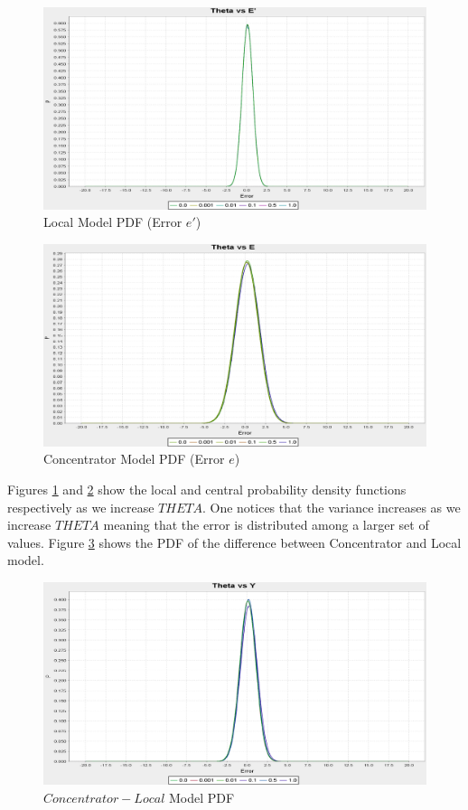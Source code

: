 \documentclass{mproj}
\begin{document}
\begin{figure}[H]
  \caption{Local Model PDF (Error $e'$)}
  \label{fig:thetaedash}
\centerline{\includegraphics[scale=0.3]{ThetaEDASH}}
\end{figure}

\begin{figure}[H]
\caption{Concentrator Model PDF (Error $e$)}
\label{fig:thetae}
\centerline{\includegraphics[scale=0.3]{ThetaE}}
\end{figure}

Figures \ref{fig:thetaedash} and \ref{fig:thetae} show the local and central probability density functions respectively as we increase $THETA$. One notices that the variance increases as we increase $THETA$ meaning that the error is distributed among a larger set of values. Figure \ref{fig:thetay} shows the PDF of the difference between Concentrator and Local model.

\begin{figure}[H]
\caption{$Concentrator - Local$ Model PDF}
\label{fig:thetay}
\centerline{\includegraphics[scale=0.3]{ThetaY}}
\end{figure}
\end{document}
